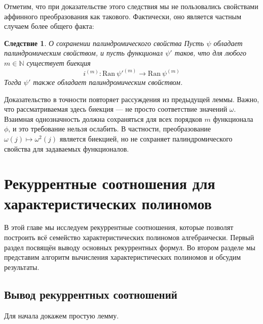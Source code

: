 \documentclass[14pt, a4paper, russian]{report}
\newtheorem{corollary}{\indent Следствие}
\begin{document}
Отметим, что при доказательстве этого следствия мы не пользовались свойствами аффинного преобразования как такового. Фактически, оно является частным случаем более общего факта:
\begin{corollary}{О сохранении палиндромического свойства}
Пусть $\psi$ обладает палиндромическим свойством, и пусть функционал $\psi'$ таков, что для любого $m \in \mathbb{N}$ существует биекция $$i^{(m)}: \mathrm{Ran}\ \psi'^{(m)} \rightarrow \mathrm {Ran}\ \psi^{(m)}$$ Тогда $\psi'$ также обладает палиндромическим свойством.
\end{corollary}
Доказательство в точности повторяет рассуждения из предыдущей леммы. Важно, что рассматриваемая здесь биекция --- не просто соответствие значений $\omega$. Взаимная однозначность должна сохраняться для всех порядков $m$ функционала $\phi$, и это требование нельзя ослабить. В частности, преобразование $\omega(j) \mapsto \omega^2(j)$ является биекцией, но не сохраняет палиндромического свойства для задаваемых функционалов.
\chapter{Рекуррентные соотношения для характеристических полиномов}
В этой главе мы исследуем рекуррентные соотношения, которые позволят построить всё семейство характеристических полиномов алгебраически. Первый раздел посвящён выводу основных рекуррентных формул. Во втором разделе мы представим алгоритм вычисления характеристических полиномов и обсудим результаты.
\section{Вывод рекуррентных соотношений}
Для начала докажем простую лемму.
\end{document}
